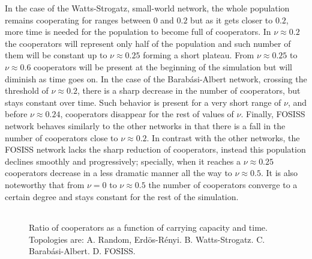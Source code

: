 \documentclass{bmcart}
\def\texttt{[image: ]}
\begin{document}
In the case of the Watts-Strogatz, small-world network, the whole
population remains cooperating for ranges between $0$ and $0.2$ but as
it gets closer to $0.2$, more time is needed for the population to
become full of cooperators. In $\nu \approx 0.2$ the cooperators will
represent only half of the population and such number of them will be
constant up to $\nu \approx 0.25$ forming a short plateau. From $\nu
\approx 0.25$ to $\nu \approx 0.6$ cooperators will be present at the
beginning of the simulation but will diminish as time goes on.  In the
case of the Barab\'asi-Albert network, crossing the threshold of $\nu
\approx 0.2$, there is a sharp decrease in the number of cooperators,
but stays constant over time. Such behavior is present for a very
short range of $\nu$, and before $\nu \approx 0.24$, cooperators
disappear for the rest of values of $\nu$. Finally, FOSISS network
behaves similarly to the other networks in that there is a fall in the
number of cooperators close to $\nu \approx 0.2$. In contrast with the
other networks, the FOSISS network lacks the sharp reduction of
cooperators, instead this population declines smoothly and
progressively; specially, when it reaches a $\nu \approx 0.25$
cooperators decrease in a less dramatic manner all the way to
$\nu \approx 0.5$. It is also noteworthy that from $\nu = 0$ to $\nu
\approx 0.5$ the number of cooperators converge to a certain degree
and stays constant for the rest of the simulation.\\


\begin{figure} [h!]
\centering
\begin{tabular}{cc}
\end{tabular}
\caption{Ratio of cooperators as a function of carrying capacity and time. Topologies are: A. Random, Erd\"{o}s-R\'enyi. B. Watts-Strogatz. C. Barab\'asi-Albert. D. FOSISS.
}\label{CD}
\end{figure}

\end{document}
